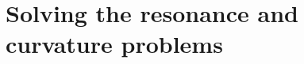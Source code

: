 \documentclass[aps,prb,superscriptaddress,amsmath,amssymb,showpacs,twocolumn]{revtex4}
\begin{document}
%
%
%

\section{Solving the resonance and curvature problems}
\end{document}
